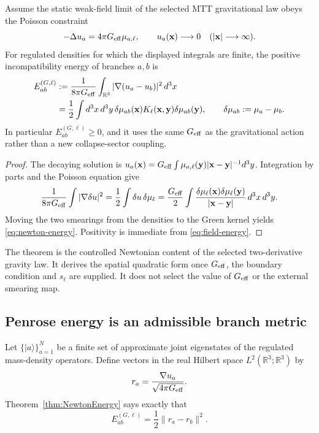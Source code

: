 \documentclass[11pt]{article}
\begin{document}
\begin{theorem}\label{thm:NewtonEnergy}
Assume the static weak-field limit of the selected MTT gravitational law obeys the
Poisson constraint
\[
 -\Delta u_a=4\pi G_{\rm eff}\mu_{a,\ell},
 \qquad u_a(\mathbf x)\longrightarrow0\quad(|\mathbf x|\longrightarrow\infty).
\]
For regulated densities for which the displayed integrals are finite, the positive
incompatibility energy of branches $a,b$ is
\begin{align}
 E_{ab}^{(G,\ell)}
 &:=\frac{1}{8\pi G_{\rm eff}}
 \int_{\mathbb R^3}|\nabla(u_a-u_b)|^2\,d^3x \label{eq:field-energy}\\
 &=\frac12\int d^3x\,d^3y\,
 \delta\mu_{ab}(\mathbf x)K_\ell(\mathbf x,\mathbf y)
 \delta\mu_{ab}(\mathbf y), \qquad
 \delta\mu_{ab}:=\mu_a-\mu_b. \label{eq:newton-energy}
\end{align}
In particular $E_{ab}^{(G,\ell)}\geq0$, and it uses the same $G_{\rm eff}$ as the
gravitational action rather than a new collapse-sector coupling.
\end{theorem}

\begin{proof}
The decaying solution is
$u_a(\mathbf x)=G_{\rm eff}\int
\mu_{a,\ell}(\mathbf y)|\mathbf x-\mathbf y|^{-1}d^3y$.
Integration by parts and the Poisson equation give
\[
 \frac{1}{8\pi G_{\rm eff}}\int|\nabla\delta u|^2
 =\frac{1}{2}\int\delta u\,\delta\mu_\ell
 =\frac{G_{\rm eff}}{2}\int
 \frac{\delta\mu_\ell(\mathbf x)\delta\mu_\ell(\mathbf y)}
 {|\mathbf x-\mathbf y|}\,d^3x\,d^3y.
\]
Moving the two smearings from the densities to the Green kernel yields
\eqref{eq:newton-energy}. Positivity is immediate from \eqref{eq:field-energy}.
\end{proof}

The theorem is the controlled Newtonian content of the selected two-derivative
gravity law. It derives the spatial quadratic form once $G_{\rm eff}$, the boundary
condition and $s_\ell$ are supplied. It does not select the value of $G_{\rm eff}$ or
the external smearing map.

\subsection{Penrose energy is an admissible branch metric}

Let $\{|a\rangle\}_{a=1}^N$ be a finite set of approximate joint eigenstates of the
regulated mass-density operators. Define vectors in the real Hilbert space
$L^2(\mathbb R^3;\mathbb R^3)$ by
\[
 r_a=\frac{\nabla u_a}{\sqrt{4\pi G_{\rm eff}}}.
\]
Theorem~\ref{thm:NewtonEnergy} says exactly that
\[
 E_{ab}^{(G,\ell)}=\frac{1}{2}\|r_a-r_b\|^2.
\]
\end{document}

